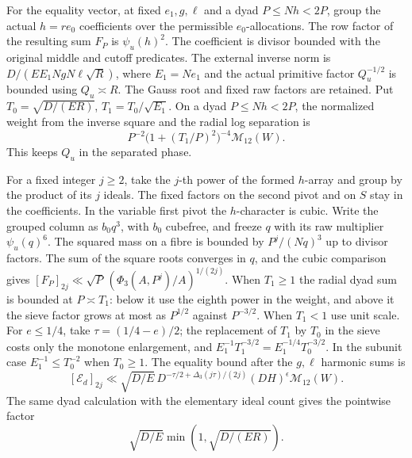 For the equality vector, at fixed \(e_1,g,\ell\) and a dyad
\(P\le Nh<2P\), group the actual \(h=re_0\) coefficients
over the permissible \(e_0\)-allocations. The row factor of the
resulting sum \(F_P\) is \(\psi_u(h)^2\). The coefficient
is divisor bounded with the original middle and cutoff predicates.
The external inverse norm is \(D/(E E_1NgN\ell\sqrt R)\),
where \(E_1=Ne_1\) and the actual primitive factor \(Q_u^{-1/2}\)
is bounded using \(Q_u\asymp R\).
The Gauss root and fixed raw factors are retained.
Put \(T_0=\sqrt{D/(ER)}\), \(T_1=T_0/\sqrt{E_1}\).
On a dyad \(P\le Nh<2P\), the normalized weight from
the inverse square and the radial log separation is
\[
 P^{-2}\bigl(1+(T_1/P)^2\bigr)^{-4}\mathcal M_{12}(W).
\]
This keeps \(Q_u\) in the separated phase.

For a fixed integer \(j\ge2\), take the \(j\)-th power of the
formed \(h\)-array and group by the product of its \(j\) ideals.
The fixed factors on the second pivot and on \(S\) stay in the
coefficients. In the variable first pivot the \(h\)-character is
cubic. Write the grouped column as \(b_0q^3\), with \(b_0\)
cubefree, and freeze \(q\) with its raw multiplier
\(\psi_u(q)^6\). The squared mass on a fibre is bounded by
\(P^j/(Nq)^3\) up to divisor factors. The sum of the square roots
converges in \(q\), and the cubic comparison gives
\([F_P]_{2j}\ll \sqrt P\,(\Phi_3(A,P^j)/A)^{1/(2j)}\).
When \(T_1\ge1\) the radial dyad sum is bounded at \(P\asymp T_1\):
below it use the eighth power in the weight, and above it the
sieve factor grows at most as \(P^{1/2}\) against \(P^{-3/2}\).
When \(T_1<1\) use unit scale. For \(e\le1/4\), take
\(\tau=(1/4-e)/2\); the replacement of \(T_1\) by \(T_0\)
in the sieve costs only the monotone enlargement, and
\(E_1^{-1}T_1^{-3/2}=E_1^{-1/4}T_0^{-3/2}\).
In the subunit case \(E_1^{-1}\le T_0^{-2}\) when \(T_0\ge1\).
The equality bound after the \(g,\ell\) harmonic sums is
\begin{equation}\label{pca:joint-equality-moment}
 [\mathcal E_d]_{2j}\ll
 \sqrt{D/E}\,D^{-\tau/2+\Delta_3(j\tau)/(2j)}
       (DH)^\epsilon\mathcal M_{12}(W).
\end{equation}
The same dyad calculation with the elementary ideal count
gives the pointwise factor
\[
 \sqrt{D/E}\min(1,\sqrt{D/(ER)}).
\]

